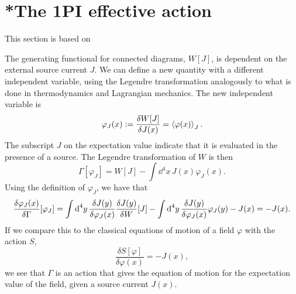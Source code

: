 \section{*The 1PI effective action}

\label{section: effective action}
This section is based on \autocite{peskinIntroductionQuantumField1995,schwartzQuantumFieldTheory2013,weinbergQuantumTheoryFields1995,weinbergQuantumTheoryFields1996}


The generating functional for connected diagrams, $W[J]$, is dependent on the external source current $J$.
We can define a new quantity with a different independent variable, using the Legendre transformation analogously to what is done in thermodynamics and Lagrangian mechanics.
The new independent variable is
\begin{equation}
    \varphi_J(x) := \frac{\delta W[J]}{\delta J(x)} = \left\langle \varphi(x) \right\rangle_J.
\end{equation}
%
The subscript $J$ on the expectation value indicate that it is evaluated in the presence of a source.
The Legendre transformation of $W$ is then
\begin{equation}
    \label{1PI effective action}
    \Gamma[\varphi_J]
    = W[J] - \int \dd^4 x \, J(x) \varphi_J(x).
\end{equation}
%
Using the definition of $\varphi_J$, we have that
\begin{equation}
    \label{effective equation of motion}
    \fdv{\varphi_J(x)} \Gamma[\varphi_J]
    = \int \dd^4 y \, \fdv{J(y)}{\varphi_J(x)} \fdv{J(y)} W[J]
    - \int \dd^4 y \, \fdv{J(y)}{\varphi_J(x)} \varphi_J(y)
    - J(x)
    = - J(x).
\end{equation}
%
If we compare this to the classical equations of motion of a field $\varphi$ with the action $S$,
\begin{equation}
    \frac{\delta S[\varphi]}{\delta \varphi(x)} = -J(x),
\end{equation}
%
we see that $\Gamma$ is an action that gives the equation of motion for the expectation value of the field, given a source current $J(x)$.

